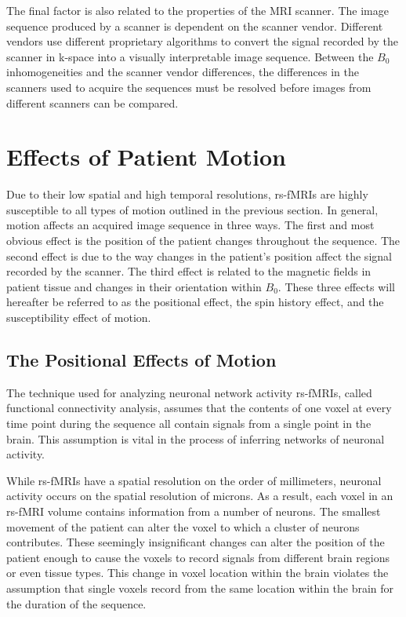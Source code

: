 The final factor is also related to the properties of the MRI scanner. The image sequence produced by a scanner is dependent on the scanner vendor. Different vendors use different proprietary algorithms to convert the signal recorded by the scanner in k-space into a visually interpretable image sequence. Between the $B_0$ inhomogeneities and the scanner vendor differences, the differences in the scanners used to acquire the sequences must be resolved before images from different scanners can be compared.

\clearpage

\section{Effects of Patient Motion}

Due to their low spatial and high temporal resolutions, rs-fMRIs are highly susceptible to all types of motion outlined in the previous section. In general, motion affects an acquired image sequence in three ways. The first and most obvious effect is the position of the patient changes throughout the sequence. The second effect is due to the way changes in the patient's position affect the signal recorded by the scanner. The third effect is related to the magnetic fields in patient tissue and changes in their orientation within $B_0$. These three effects will hereafter be referred to as the positional effect, the spin history effect, and the susceptibility effect of motion.

\subsection{The Positional Effects of Motion}

The technique used for analyzing neuronal network activity rs-fMRIs, called functional connectivity analysis, assumes that the contents of one voxel at every time point during the sequence all contain signals from a single point in the brain. This assumption is vital in the process of inferring networks of neuronal activity. 

While rs-fMRIs have a spatial resolution on the order of millimeters, neuronal activity occurs on the spatial resolution of microns. As a result, each voxel in an rs-fMRI volume contains information from a number of neurons. The smallest movement of the patient can alter the voxel to which a cluster of neurons contributes. These seemingly insignificant changes can alter the position of the patient enough to cause the voxels to record signals from different brain regions or even tissue types. This change in voxel location within the brain violates the assumption that single voxels record from the same location within the brain for the duration of the sequence.

